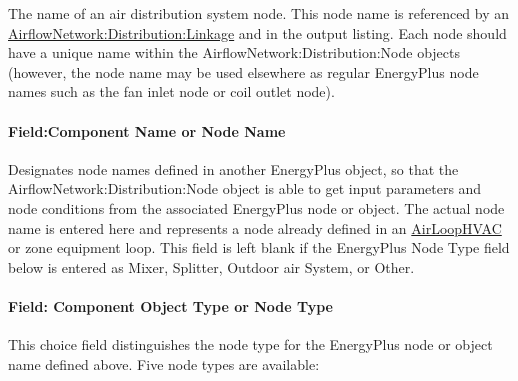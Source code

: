The name of an air distribution system node. This node name is referenced by an \hyperref[airflownetworkdistributionlinkage]{AirflowNetwork:Distribution:Linkage} and in the output listing. Each node should have a unique name within the AirflowNetwork:Distribution:Node objects (however, the node name may be used elsewhere as regular EnergyPlus node names such as the fan inlet node or coil outlet node).

\paragraph{Field:Component Name or Node Name}\label{fieldcomponent-name-or-node-name}

Designates node names defined in another EnergyPlus object, so that the AirflowNetwork:Distribution:Node object is able to get input parameters and node conditions from the associated EnergyPlus node or object. The actual node name is entered here and represents a node already defined in an \hyperref[airloophvac]{AirLoopHVAC} or zone equipment loop. This field is left blank if the EnergyPlus Node Type field below is entered as Mixer, Splitter, Outdoor air System, or Other.

\paragraph{Field: Component Object Type or Node Type}\label{field-component-object-type-or-node-type}

This choice field distinguishes the node type for the EnergyPlus node or object name defined above. Five node types are available:

